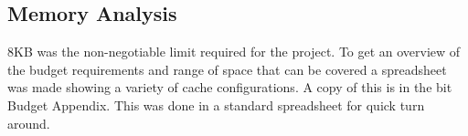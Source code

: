 \subsection{Memory Analysis}
8KB was the non-negotiable limit required for the project. To get an overview of the budget requirements and range of space that can be covered a spreadsheet was made showing a variety of cache configurations. A copy of this is in the bit Budget Appendix. This was done in a standard spreadsheet for quick turn around.
